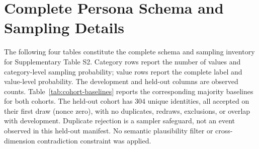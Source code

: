 \documentclass{ieeeaccess}
\begin{document}
\clearpage
\section{Complete Persona Schema and Sampling Details}

The following four tables constitute the complete schema and sampling inventory for
Supplementary Table S2. Category rows report the number of values and category-level
sampling probability; value rows report the complete label and value-level probability.
The development and held-out columns are observed counts. Table~\ref{tab:cohort-baselines}
reports the corresponding majority baselines for both cohorts. The held-out cohort has
304 unique identities, all accepted on their first draw (nonce zero), with no duplicates,
redraws, exclusions, or overlap with development. Duplicate rejection is a sampler
safeguard, not an event observed in this held-out manifest. No semantic plausibility
filter or cross-dimension contradiction constraint was applied.
\end{document}
